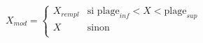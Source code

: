 \[
X_{mod} = \begin{cases}
X_{rempl} & \text{si } \text{plage}_{inf} < X < \text{plage}_{sup}\\
X & \text{sinon}\\
\end{cases}
\]

